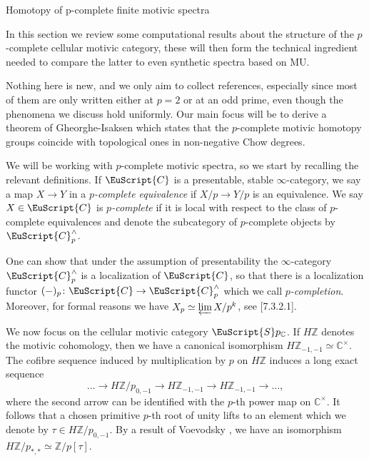 \documentclass[oneside,a4paper]{amsart}
\makeatletter
\newcommand{\euscr}[1]{\EuScript{#1}} %
\newcommand{\ccat}{\euscr{C}} %
\newcommand{\MU}{\mathrm{MU}} %
\newcommand{\cspectra}{\euscr{S}p_{\mathbb{C}}} %
\newcommand{\pcomplete}{^{\wedge} _{p}} %
\newcommand{\integralem}{H \mathbb{Z}} %
\theoremstyle{plain}
\theoremstyle{definition}
\theoremstyle{remark}
\def\subsection{\@startsection{subsection}{1}%
  \z@{.7\linespacing\@plus\linespacing}{.5\linespacing}%
  {\normalfont\bfseries\centering}}%
\makeatother
\begin{document}
\subsection{Homotopy of p-complete finite motivic spectra}

In this section we review some computational results about the structure of the $p$-complete cellular motivic category, these will then form the technical ingredient needed to compare the latter to even synthetic spectra based on $\MU$. 

Nothing here is new, and we only aim to collect references, especially since most of them are only written either at $p = 2$ or at an odd prime, even though the phenomena we discuss hold uniformly. Our main focus will be to derive a theorem of Gheorghe-Isaksen which states that the $p$-complete motivic homotopy groups coincide with topological ones in non-negative Chow degrees. 

We will be working with $p$-complete motivic spectra, so we start by recalling the relevant definitions. If $\ccat$ is a presentable, stable $\infty$-category, we say a map $X \rightarrow Y$ in a \emph{$p$-complete equivalence} if $X / p \rightarrow Y / p$ is an equivalence. We say $X \in \ccat$ is \emph{$p$-complete} if it is local with respect to the class of $p$-complete equivalences and denote the subcategory of $p$-complete objects by $\ccat \pcomplete$. 

One can show that under the assumption of presentability the $\infty$-category $\ccat \pcomplete$ is a localization of $\ccat$, so that there is a localization functor $(-)_{p} \colon \ccat \rightarrow \ccat \pcomplete$ which we call \emph{$p$-completion}. Moreover, for formal reasons we have $X_{p} \simeq \varprojlim X / p^{k}$, see \cite{lurie_spectral_algebraic_geometry}[7.3.2.1].

We now focus on the cellular motivic category $\cspectra$. If $\integralem$ denotes the motivic cohomology, then we have a canonical isomorphism $\integralem_{-1, -1} \simeq \mathbb{C}^{\times}$. The cofibre sequence induced by multiplication by $p$ on $\integralem$ induces a long exact sequence
\[
\ldots \rightarrow \integralem / p _{0, -1} \rightarrow \integralem_{-1, -1}  \rightarrow \integralem_{-1, -1} \rightarrow \ldots,
\]
where the second arrow can be identified with the $p$-th power map on $\mathbb{C}^{\times}$. It follows that a chosen primitive $p$-th root of unity lifts to an element which we denote by $\tau \in \integralem / p_{0, -1}$. By a result of Voevodsky \cite{voevodsky2010motivic}, we have an isomorphism $\integralem / p _{*, *} \simeq \mathbb{Z} / p [\tau]$.
\end{document}
